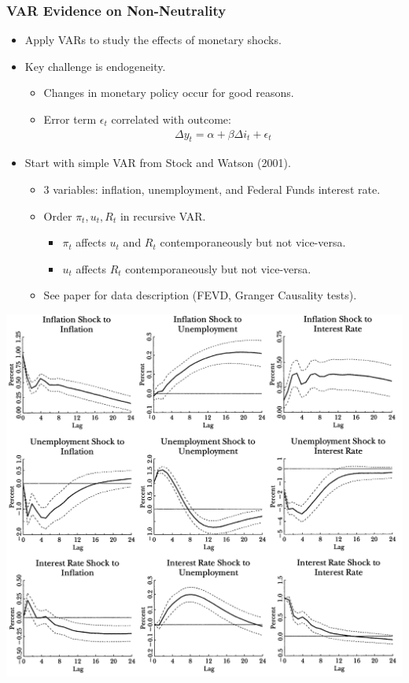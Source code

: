\documentclass[english,xcolor=svgnames]{beamer}
\begin{document}
\begin{frame}
\frametitle{VAR Evidence on Non-Neutrality
}
\begin{itemize}
	\item Apply VARs to study the effects of monetary shocks.
	\item Key challenge is endogeneity.
	\begin{itemize}
		\item Changes in monetary policy occur for good reasons.
		\item Error term $\epsilon_t$ correlated with outcome:
		\begin{align*}
			\Delta y_t = \alpha +\beta \Delta i_t + \epsilon_t
		\end{align*}
	\end{itemize}
	\item Start with simple VAR from Stock and Watson (2001).
	\begin{itemize}
		\item 3 variables: inflation, unemployment, and Federal Funds interest rate.
		\item Order $\pi_t, u_t, R_t$ in recursive VAR.
		\begin{itemize}
			\item $\pi_t$ affects $u_t$ and $R_t$ contemporaneously but not vice-versa.
			\item $u_t$ affects $R_t$ contemporaneously but not vice-versa.
		\end{itemize}
		\item See paper for data description (FEVD, Granger Causality tests).
	\end{itemize}
\end{itemize}
\end{frame}


\begin{frame}
\centering
\includegraphics[scale=0.3]{../../Images/stockwatson2001irf.png}
\end{frame}
\end{document}
